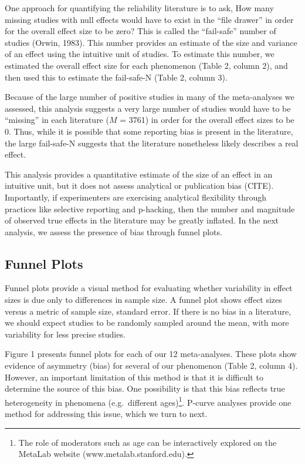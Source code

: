 \documentclass[english,floatsintext,man]{apa6}
\begin{document}
One approach for quantifying the reliability literature is to ask, How
many missing studies with null effects would have to exist in the
\enquote{file drawer} in order for the overall effect size to be zero?
This is called the \enquote{fail-safe} number of studies (Orwin, 1983).
This number provides an estimate of the size and variance of an effect
using the intuitive unit of studies. To estimate this number, we
estimated the overall effect size for each phenomenon (Table 2, column
2), and then used this to estimate the fail-safe-N (Table 2, column 3).

Because of the large number of positive studies in many of the
meta-analyses we assessed, this analysis suggests a very large number of
studies would have to be \enquote{missing} in each literature (\(M\) =
3761) in order for the overall effect sizes to be 0. Thus, while it is
possible that some reporting bias is present in the literature, the
large fail-safe-N suggests that the literature nonetheless likely
describes a real effect.

This analysis provides a quantitative estimate of the size of an effect
in an intuitive unit, but it does not assess analytical or publication
bias (CITE). Importantly, if experimenters are exercising analytical
flexibility through practices like selective reporting and p-hacking,
then the number and magnitude of observed true effects in the literature
may be greatly inflated. In the next analysis, we assess the presence of
bias through funnel plots.

\subsection{Funnel Plots}\label{funnel-plots}

Funnel plots provide a visual method for evaluating whether variability
in effect sizes is due only to differences in sample size. A funnel plot
shows effect sizes versus a metric of sample size, standard error. If
there is no bias in a literature, we should expect studies to be
randomly sampled around the mean, with more variability for less precise
studies.

Figure 1 presents funnel plots for each of our 12 meta-analyses. These
plots show evidence of asymmetry (bias) for several of our phenomenon
(Table 2, column 4). However, an important limitation of this method is
that it is difficult to determine the source of this bias. One
possibility is that this bias reflects true heterogeneity in phenomena
(e.g.~different
ages)\footnote{The role of moderators such as age can be interactively explored on the MetaLab website (www.metalab.stanford.edu).}.
P-curve analyses provide one method for addressing this issue, which we
turn to next.
\end{document}
